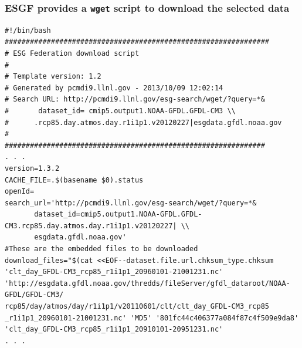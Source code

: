 \documentclass[xcolor=dvipsnames,compress,subsection=false]{beamer}
\begin{document}

\begin{frame}[t,fragile]
  \frametitle{ESGF provides a \texttt{wget} script to download the selected data}
  \begin{tiny} 
\begin{verbatim}
#!/bin/bash
###############################################################
# ESG Federation download script
#
# Template version: 1.2
# Generated by pcmdi9.llnl.gov - 2013/10/09 12:02:14
# Search URL: http://pcmdi9.llnl.gov/esg-search/wget/?query=*&
#       dataset_id= cmip5.output1.NOAA-GFDL.GFDL-CM3 \\
#      .rcp85.day.atmos.day.r1i1p1.v20120227|esgdata.gfdl.noaa.gov
#
##############################################################
. . .
version=1.3.2
CACHE_FILE=.$(basename $0).status
openId=
search_url='http://pcmdi9.llnl.gov/esg-search/wget/?query=*&
       dataset_id=cmip5.output1.NOAA-GFDL.GFDL-CM3.rcp85.day.atmos.day.r1i1p1.v20120227| \\
       esgdata.gfdl.noaa.gov'
#These are the embedded files to be downloaded
download_files="$(cat <<EOF--dataset.file.url.chksum_type.chksum
'clt_day_GFDL-CM3_rcp85_r1i1p1_20960101-21001231.nc'
'http://esgdata.gfdl.noaa.gov/thredds/fileServer/gfdl_dataroot/NOAA-GFDL/GFDL-CM3/
rcp85/day/atmos/day/r1i1p1/v20110601/clt/clt_day_GFDL-CM3_rcp85
_r1i1p1_20960101-21001231.nc' 'MD5' '801fc44c406377a084f87c4f509e9da8'
'clt_day_GFDL-CM3_rcp85_r1i1p1_20910101-20951231.nc'
. . . 
  \end{verbatim} 
  \end{tiny}
\end{frame}
\end{document}

